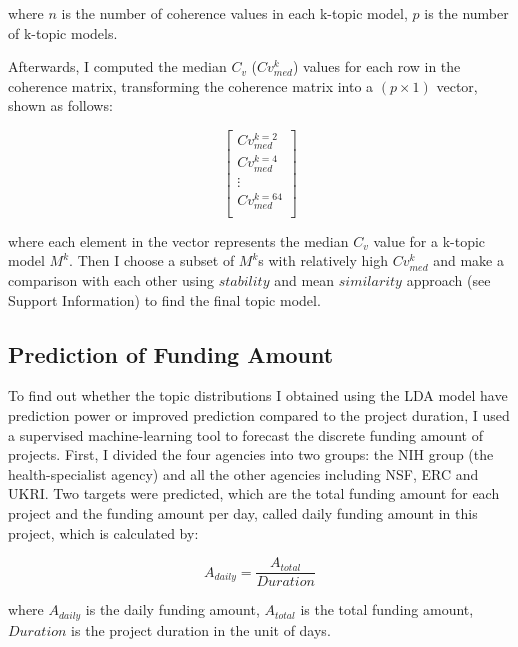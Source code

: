 where $n$ is the number of coherence values in each k-topic model, $p$ is the number of k-topic models.

Afterwards, I computed the median $C_v$ ($Cv_{med}^{k}$) values for each row in the coherence matrix, transforming the coherence matrix into a $(p \times 1)$ vector, shown as follows:

\begin{equation}
  \begin{bmatrix}
  Cv_{med}^{k = 2} \\
  Cv_{med}^{k = 4} \\
  \vdots \\
  Cv_{med}^{k = 64} \\
  \end{bmatrix}
\end{equation}

where each element in the vector represents the median $C_v$ value for a k-topic model $M^k$. Then I choose a subset of $M^k$s with relatively high $Cv_{med}^{k}$ and make a comparison with each other using $stability$ and mean $similarity$ approach (see Support Information) to find the final topic model.

\subsection{Prediction of Funding Amount}

To find out whether the topic distributions I obtained using the LDA model have prediction power or improved prediction compared to the project duration, I used a supervised machine-learning tool to forecast the discrete funding amount of projects. First, I divided the four agencies into two groups: the NIH group (the health-specialist agency) and all the other agencies including NSF, ERC and UKRI. Two targets were predicted, which are the total funding amount for each project and the funding amount per day, called daily funding amount in this project, which is calculated by:

\begin{equation}
  A_{daily} = \frac{A_{total}}{Duration}
\end{equation}

where $A_{daily}$ is the daily funding amount, $A_{total}$ is the total funding amount, $Duration$ is the project duration in the unit of days.

